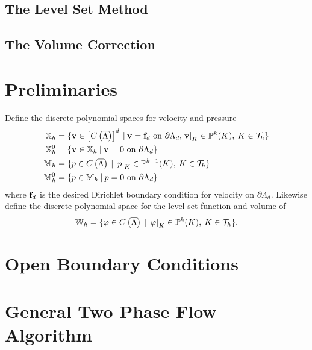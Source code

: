 \documentclass[letterpaper]{erdc}
\begin{document}
\subsection{The Level Set Method}\label{sec:LevelSetMethod}

\subsection{The Volume Correction}\label{sec:VolumeCorrection}



%
%
%
\section{Preliminaries}\label{sec:2PPreliminaries}
Define the discrete polynomial spaces for velocity and pressure
\begin{align*}  
	\mathbb{X}_h &= \{\textbf{v}\in \left[C\left(\overline{\Lambda}\right)\right]^d \:|\: \textbf{v} = \mathbf{f}_d \mbox{ on } \partial\Lambda_{d}, \left.\textbf{v}\right|_{K}\in\mathbb{P}^{k}(K), \:K\in\mathcal{T}_h  \} \\
  	\mathbb{X}^0_h &= \{\textbf{v}\in \mathbb{X}_h \:|\: \textbf{v} = 0 \mbox{ on } \partial\Lambda_{d} \} \\
		\mathbb{M}_h &= \{p\in C\left(\overline{\Lambda}\right) \:|\: \left.p\right|_{K}\in\mathbb{P}^{k-1}(K),\: K\in\mathcal{T}_h  \}\\
    \mathbb{M}^{0}_h &= \{p\in \mathbb{M}_h \:|\: p = 0 \mbox{ on } \partial\Lambda_{d} \}
\end{align*} 
where $\mathbf{f}_d$ is the desired Dirichlet boundary condition for velocity on $\partial\Lambda_{d}$.  Likewise define the discrete polynomial space for the level set function and volume of 
\begin{equation*}
\mathbb{W}_h = \{ \varphi \in C\left(\overline{\Lambda}\right) \:|\: \left.\varphi\right|_{K} \in \mathbb{P}^{k}(K),\: K\in\mathcal{T}_h \}.
\end{equation*}

%
%
%
\section{Open Boundary Conditions}\label{sec:BoundaryConditions}



%
%
%
\section{General Two Phase Flow Algorithm}\label{sec:General2PFlowAlgorithm}
\end{document}
